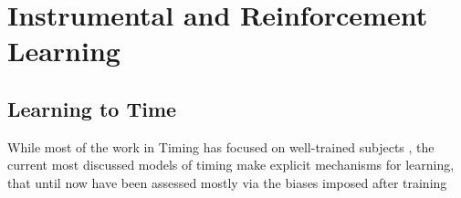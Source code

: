 \chapter{Instrumental and Reinforcement Learning}


\section{Learning to Time}
While most of the work in Timing has focused on well-trained subjects \cite{}, the current most discussed models of timing make explicit mechanisms for learning, that until now have been assessed mostly via the biases imposed after training \cite{}

\section{}


